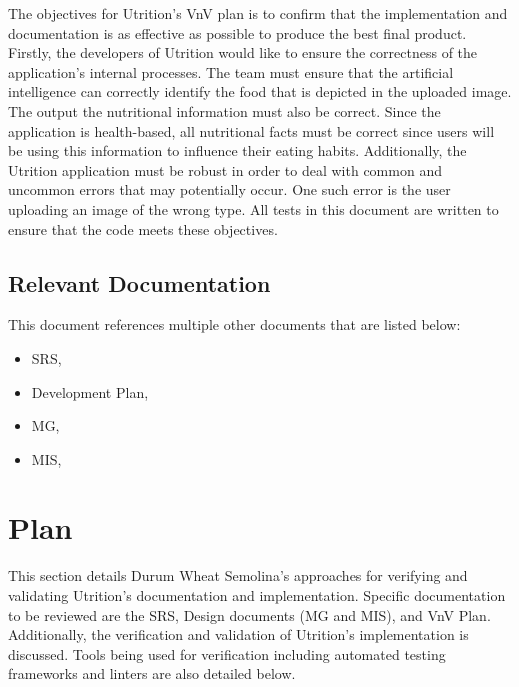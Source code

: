 \documentclass[12pt, titlepage]{article}
\begin{document}
		The objectives for Utrition's VnV plan is to confirm that the implementation and documentation is as effective as possible to produce the best final product. Firstly, the developers of Utrition would like to ensure the correctness of the application's internal processes. The team must ensure that the artificial intelligence can correctly identify the food that is depicted in the uploaded image. The output the nutritional information must also be correct. Since the application is health-based, all nutritional facts must be correct since users will be using this information to influence their eating habits. Additionally, the Utrition application must be robust in order to deal with common and uncommon errors that may potentially occur. One such error is the user uploading an image of the wrong type. All tests in this document are written to ensure that the code meets these objectives. 
	
	\subsection{Relevant Documentation}
	

		This document references multiple other documents that are listed below:
		
		\begin{itemize}
			\item SRS, \citet{SRS}
			\item Development Plan, \citet{DevelopmentPlan}
			\item MG, \citet{MG}
			\item MIS, \citet{MIS}
		\end{itemize}
	
	\section{Plan}
	
	This section details Durum Wheat Semolina's approaches for verifying and validating Utrition's documentation and implementation. Specific documentation to be reviewed are the SRS, Design documents (MG and MIS), and VnV Plan. Additionally, the verification and validation of Utrition's implementation is discussed. Tools being used for verification including automated testing frameworks and linters are also detailed below.
	
\end{document}
